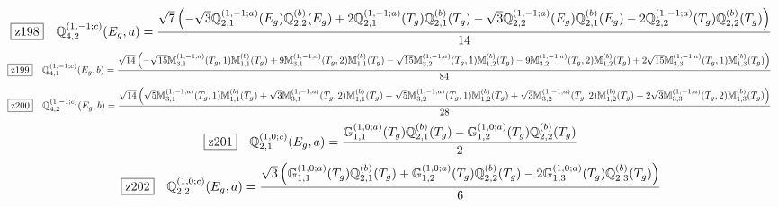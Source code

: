 \documentclass[fleqn,10pt,landscape]{jsarticle}
\begin{document}
\begin{dmath*}
\hspace*{3mm}\fbox{z198}\quad \mathbb{Q}_{4,2}^{(1,-1;c)}(E_{g},a)=\frac{\sqrt{7} \left(- \sqrt{3} \mathbb{Q}_{2,1}^{(1,-1;a)}(E_{g}) \mathbb{Q}_{2,2}^{(b)}(E_{g}) + 2 \mathbb{Q}_{2,1}^{(1,-1;a)}(T_{g}) \mathbb{Q}_{2,1}^{(b)}(T_{g}) - \sqrt{3} \mathbb{Q}_{2,2}^{(1,-1;a)}(E_{g}) \mathbb{Q}_{2,1}^{(b)}(E_{g}) - 2 \mathbb{Q}_{2,2}^{(1,-1;a)}(T_{g}) \mathbb{Q}_{2,2}^{(b)}(T_{g})\right)}{14}
\end{dmath*}
\begin{dmath*}
\hspace*{3mm}\fbox{z199}\quad \mathbb{Q}_{4,1}^{(1,-1;c)}(E_{g},b)=\frac{\sqrt{14} \left(- \sqrt{15} \mathbb{M}_{3,1}^{(1,-1;a)}(T_{g},1) \mathbb{M}_{1,1}^{(b)}(T_{g}) + 9 \mathbb{M}_{3,1}^{(1,-1;a)}(T_{g},2) \mathbb{M}_{1,1}^{(b)}(T_{g}) - \sqrt{15} \mathbb{M}_{3,2}^{(1,-1;a)}(T_{g},1) \mathbb{M}_{1,2}^{(b)}(T_{g}) - 9 \mathbb{M}_{3,2}^{(1,-1;a)}(T_{g},2) \mathbb{M}_{1,2}^{(b)}(T_{g}) + 2 \sqrt{15} \mathbb{M}_{3,3}^{(1,-1;a)}(T_{g},1) \mathbb{M}_{1,3}^{(b)}(T_{g})\right)}{84}
\end{dmath*}
\begin{dmath*}
\hspace*{3mm}\fbox{z200}\quad \mathbb{Q}_{4,2}^{(1,-1;c)}(E_{g},b)=\frac{\sqrt{14} \left(\sqrt{5} \mathbb{M}_{3,1}^{(1,-1;a)}(T_{g},1) \mathbb{M}_{1,1}^{(b)}(T_{g}) + \sqrt{3} \mathbb{M}_{3,1}^{(1,-1;a)}(T_{g},2) \mathbb{M}_{1,1}^{(b)}(T_{g}) - \sqrt{5} \mathbb{M}_{3,2}^{(1,-1;a)}(T_{g},1) \mathbb{M}_{1,2}^{(b)}(T_{g}) + \sqrt{3} \mathbb{M}_{3,2}^{(1,-1;a)}(T_{g},2) \mathbb{M}_{1,2}^{(b)}(T_{g}) - 2 \sqrt{3} \mathbb{M}_{3,3}^{(1,-1;a)}(T_{g},2) \mathbb{M}_{1,3}^{(b)}(T_{g})\right)}{28}
\end{dmath*}
\begin{dmath*}
\hspace*{3mm}\fbox{z201}\quad \mathbb{Q}_{2,1}^{(1,0;c)}(E_{g},a)=\frac{\mathbb{G}_{1,1}^{(1,0;a)}(T_{g}) \mathbb{Q}_{2,1}^{(b)}(T_{g}) - \mathbb{G}_{1,2}^{(1,0;a)}(T_{g}) \mathbb{Q}_{2,2}^{(b)}(T_{g})}{2}
\end{dmath*}
\begin{dmath*}
\hspace*{3mm}\fbox{z202}\quad \mathbb{Q}_{2,2}^{(1,0;c)}(E_{g},a)=\frac{\sqrt{3} \left(\mathbb{G}_{1,1}^{(1,0;a)}(T_{g}) \mathbb{Q}_{2,1}^{(b)}(T_{g}) + \mathbb{G}_{1,2}^{(1,0;a)}(T_{g}) \mathbb{Q}_{2,2}^{(b)}(T_{g}) - 2 \mathbb{G}_{1,3}^{(1,0;a)}(T_{g}) \mathbb{Q}_{2,3}^{(b)}(T_{g})\right)}{6}
\end{dmath*}
\end{document}
